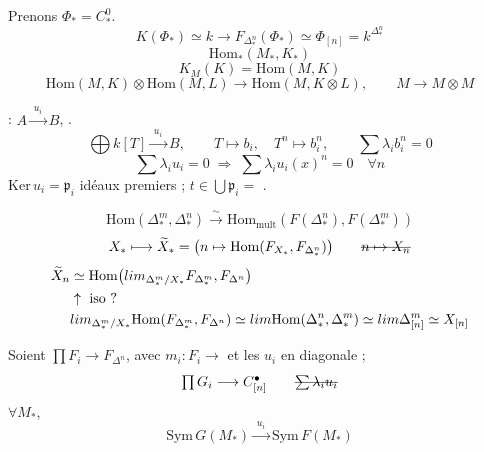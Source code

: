 \documentclass[11pt,a4paper]{article}
\begin{document}
Prenons $\Phi_* = C^0_*$.
\[
K(\Phi_*) \simeq k \longrightarrow F_{\Delta^n_*}(\Phi_*) \simeq \Phi_{[n]} = k^{\Delta^n_*}
\]
 \quad {} \quad {}
\[
\mathrm{Hom}_*(M_* , K_*)
\]
\[
K_M(K) = \mathrm{Hom}(M , K)
\]
\[
\mathrm{Hom}(M , K) \otimes \mathrm{Hom}(M , L) \longrightarrow \mathrm{Hom}(M , K \otimes L) ,
\qquad M \longrightarrow M \otimes M
\]


 : $A \xrightarrow{\;u_i\;} B$, \ill{}  \ill{}.
\[
\textstyle\bigoplus k[T] \xrightarrow{\;u_i\;} B , \qquad T \mapsto b_i , \quad T^n \mapsto b_i^n ,
\qquad \sum \lambda_i b_i^n = 0
\]
\[
\textstyle\sum \lambda_i u_i = 0 \;\Rightarrow\; \sum \lambda_i u_i(x)^n = 0 \quad \forall n
\]
$\mathrm{Ker}\, u_i = \mathfrak{p}_i$ idéaux premiers \ill{} ; $t \in \bigcup \mathfrak{p}_i =$ .

\[
\mathrm{Hom}(\Delta^m_* , \Delta^n_*) \xrightarrow{\;\sim\;} \mathrm{Hom}_{\mathrm{mult}}(F(\Delta^n_*) , F(\Delta^m_*))
\]
\[
X_* \longmapsto \widetilde{X}_* = \bigl( n \mapsto \mathrm{Hom}(F_{X_*} , F_{\Delta^n_*}) \bigr)
\qquad \text{\struck{$n \mapsto X_n$}}
\]
\[
\begin{aligned}
\widetilde{X}_n &\simeq \mathrm{Hom}\bigl( \varprojlim_{\Delta^m_*/X_*} F_{\Delta^m_*} , F_{\Delta^n} \bigr) \\
&\uparrow \text{ iso ?} \\
&\varinjlim_{\Delta^m_*/X_*} \mathrm{Hom}(F_{\Delta^m_*} , F_{\Delta^n})
\simeq \varinjlim \mathrm{Hom}(\Delta^n_* , \Delta^m_*) \simeq \varinjlim \Delta^m_{[n]} \simeq X_{[n]}
\end{aligned}
\]

Soient  $\prod F_i \to F_{\Delta^n}$, avec $m_i \colon F_i \to$ \ill{} et les $u_i$ en diagonale ;
\[
\textstyle\prod G_i \longrightarrow C^\bullet_{[n]}
\qquad \text{\struck{$\sum \lambda_i u_i$}}
\]
$\forall M_*$, 
\[
\mathrm{Sym}\, G(M_*) \xrightarrow{\;u_i\;} \mathrm{Sym}\, F(M_*)
\]

\end{document}
